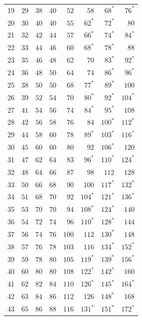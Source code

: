 \begin{longtable}{@{}r*{7}{r}@{}}
19&\(29\)&\(38\)&\(40\)&\(52\)&\(58\)&\(68^{*}\)&\(76^{*}\)\\
20&\(30\)&\(40\)&\(40\)&\(55\)&\(62^{*}\)&\(72^{*}\)&\(80\)\\
21&\(32\)&\(42\)&\(44\)&\(57\)&\(66^{*}\)&\(74^{*}\)&\(84^{*}\)\\
22&\(33\)&\(44\)&\(46\)&\(60\)&\(68^{*}\)&\(78^{*}\)&\(88\)\\
23&\(35\)&\(46\)&\(48\)&\(62\)&\(70\)&\(83^{*}\)&\(92^{*}\)\\
24&\(36\)&\(48\)&\(50\)&\(64\)&\(74\)&\(86^{*}\)&\(96^{*}\)\\
25&\(38\)&\(50\)&\(50\)&\(68\)&\(77^{*}\)&\(89^{*}\)&\(100\)\\
26&\(39\)&\(52\)&\(54\)&\(70\)&\(80^{*}\)&\(92^{*}\)&\(104^{*}\)\\
27&\(41\)&\(54\)&\(56\)&\(74\)&\(84^{*}\)&\(95^{*}\)&\(108\)\\
28&\(42\)&\(56\)&\(58\)&\(76\)&\(84\)&\(100^{*}\)&\(112^{*}\)\\
29&\(44\)&\(58\)&\(60\)&\(78\)&\(89^{*}\)&\(103^{*}\)&\(116^{*}\)\\
30&\(45\)&\(60\)&\(60\)&\(80\)&\(92\)&\(106^{*}\)&\(120\)\\
31&\(47\)&\(62\)&\(64\)&\(83\)&\(96^{*}\)&\(110^{*}\)&\(124^{*}\)\\
32&\(48\)&\(64\)&\(66\)&\(87\)&\(98\)&\(112\)&\(128\)\\
33&\(50\)&\(66\)&\(68\)&\(90\)&\(100\)&\(117^{*}\)&\(132^{*}\)\\
34&\(51\)&\(68\)&\(70\)&\(92\)&\(104^{*}\)&\(121^{*}\)&\(136^{*}\)\\
35&\(53\)&\(70\)&\(70\)&\(94\)&\(108^{*}\)&\(124^{*}\)&\(140\)\\
36&\(54\)&\(72\)&\(74\)&\(96\)&\(110^{*}\)&\(128^{*}\)&\(144\)\\
37&\(56\)&\(74\)&\(76\)&\(100\)&\(112\)&\(130^{*}\)&\(148\)\\
38&\(57\)&\(76\)&\(78\)&\(103\)&\(116\)&\(134^{*}\)&\(152^{*}\)\\
39&\(59\)&\(78\)&\(80\)&\(105\)&\(119^{*}\)&\(139^{*}\)&\(156^{*}\)\\
40&\(60\)&\(80\)&\(80\)&\(108\)&\(122^{*}\)&\(142^{*}\)&\(160\)\\
41&\(62\)&\(82\)&\(84\)&\(110\)&\(126^{*}\)&\(145^{*}\)&\(164^{*}\)\\
42&\(63\)&\(84\)&\(86\)&\(112\)&\(126\)&\(148^{*}\)&\(168\)\\
43&\(65\)&\(86\)&\(88\)&\(116\)&\(131^{*}\)&\(151^{*}\)&\(172^{*}\)\\

\end{longtable}
